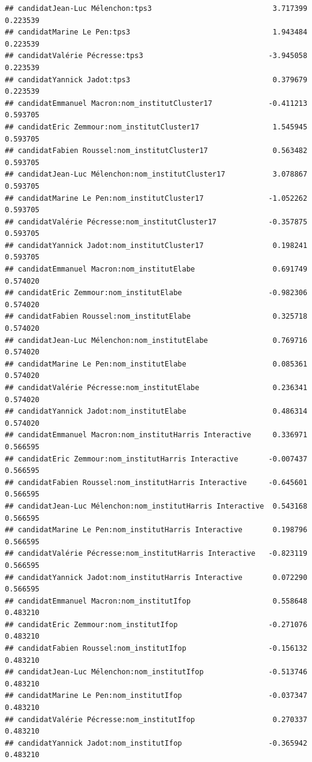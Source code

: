 \documentclass[
]{book}
\begin{document}
\begin{verbatim}
## candidatJean-Luc Mélenchon:tps3                            3.717399   0.223539
## candidatMarine Le Pen:tps3                                 1.943484   0.223539
## candidatValérie Pécresse:tps3                             -3.945058   0.223539
## candidatYannick Jadot:tps3                                 0.379679   0.223539
## candidatEmmanuel Macron:nom_institutCluster17             -0.411213   0.593705
## candidatEric Zemmour:nom_institutCluster17                 1.545945   0.593705
## candidatFabien Roussel:nom_institutCluster17               0.563482   0.593705
## candidatJean-Luc Mélenchon:nom_institutCluster17           3.078867   0.593705
## candidatMarine Le Pen:nom_institutCluster17               -1.052262   0.593705
## candidatValérie Pécresse:nom_institutCluster17            -0.357875   0.593705
## candidatYannick Jadot:nom_institutCluster17                0.198241   0.593705
## candidatEmmanuel Macron:nom_institutElabe                  0.691749   0.574020
## candidatEric Zemmour:nom_institutElabe                    -0.982306   0.574020
## candidatFabien Roussel:nom_institutElabe                   0.325718   0.574020
## candidatJean-Luc Mélenchon:nom_institutElabe               0.769716   0.574020
## candidatMarine Le Pen:nom_institutElabe                    0.085361   0.574020
## candidatValérie Pécresse:nom_institutElabe                 0.236341   0.574020
## candidatYannick Jadot:nom_institutElabe                    0.486314   0.574020
## candidatEmmanuel Macron:nom_institutHarris Interactive     0.336971   0.566595
## candidatEric Zemmour:nom_institutHarris Interactive       -0.007437   0.566595
## candidatFabien Roussel:nom_institutHarris Interactive     -0.645601   0.566595
## candidatJean-Luc Mélenchon:nom_institutHarris Interactive  0.543168   0.566595
## candidatMarine Le Pen:nom_institutHarris Interactive       0.198796   0.566595
## candidatValérie Pécresse:nom_institutHarris Interactive   -0.823119   0.566595
## candidatYannick Jadot:nom_institutHarris Interactive       0.072290   0.566595
## candidatEmmanuel Macron:nom_institutIfop                   0.558648   0.483210
## candidatEric Zemmour:nom_institutIfop                     -0.271076   0.483210
## candidatFabien Roussel:nom_institutIfop                   -0.156132   0.483210
## candidatJean-Luc Mélenchon:nom_institutIfop               -0.513746   0.483210
## candidatMarine Le Pen:nom_institutIfop                    -0.037347   0.483210
## candidatValérie Pécresse:nom_institutIfop                  0.270337   0.483210
## candidatYannick Jadot:nom_institutIfop                    -0.365942   0.483210

\end{verbatim}
\end{document}
